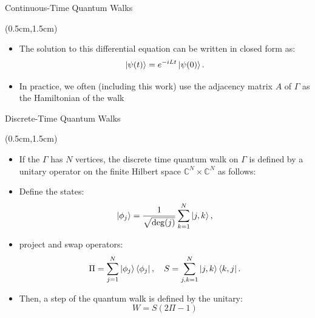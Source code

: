 \documentclass{beamer}
\theoremstyle{definition}
\begin{document}
\begin{frame}{Continuous-Time Quantum Walks}
    
    \begin{textblock*}{12cm}(0.5cm,1.5cm)

        \begin{itemize}
            \item The solution to this differential
            equation can be written in closed form as:
            \[
                \ket{\psi(t)} = e^{-iLt} \ket{\psi(0)}.
            \]
            \item In practice, we often (including this work) use the adjacency matrix $A$ of $\Gamma$ as the Hamiltonian of the walk
            
        \end{itemize}
            
    \end{textblock*}
\end{frame}





\begin{frame}{Discrete-Time Quantum Walks}
    \begin{textblock*}{12cm}(0.5cm,1.5cm)
        \begin{itemize}
           
            
            \item If the $\Gamma$ has $N$ vertices, the discrete time quantum walk on $\Gamma$ is defined by a unitary operator on the finite Hilbert space $\mathbb{C}^N \times \mathbb{C}^N$ as follows:
            \item Define the states:
            \[ \ket{\phi_j} = \frac{1}{\sqrt{\deg(j)}} \sum_{k = 1}^N \ket{j, k}, \]
            \item project and swap operators:
            \[ \Pi = \sum_{j = 1}^N \ket{\phi_j} \bra{\phi_j}, \quad S = \sum_{j, k = 1}^N \ket{j, k} \bra{k, j}. \]
            \item Then, a step of the quantum walk is defined by the unitary:
             \[
             W = S(2\Pi - 1)
             \]

        \end{itemize}
    \end{textblock*}
\end{frame}
\end{document}
